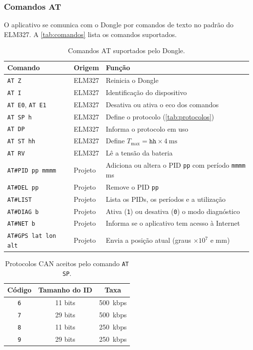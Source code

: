 \documentclass[12pt]{article}
\begin{document}
\subsubsection{Comandos AT}
 
O aplicativo se comunica com o Dongle por comandos de texto no padrão do ELM327. A \autoref{tab:comandos} lista os comandos suportados.
 
\begin{table}[htbp]
  \centering
  \caption{Comandos AT suportados pelo Dongle.}
  \label{tab:comandos}
  \begin{tabular}{lll}
    \toprule
    Comando & Origem & Função \\
    \midrule
    \texttt{AT Z}        & ELM327  & Reinicia o Dongle \\
    \texttt{AT I}        & ELM327  & Identificação do dispositivo \\
    \texttt{AT E0}, \texttt{AT E1} & ELM327 & Desativa ou ativa o eco dos comandos \\
    \texttt{AT SP h}     & ELM327  & Define o protocolo (\autoref{tab:protocolos}) \\
    \texttt{AT DP}       & ELM327  & Informa o protocolo em uso \\
    \texttt{AT ST hh}    & ELM327  & Define $T_{\max} = \mathtt{hh} \times \SI{4}{\milli\second}$ \\
    \texttt{AT RV}       & ELM327  & Lê a tensão da bateria \\
    \midrule
    \texttt{AT\#PID pp mmmm} & Projeto & Adiciona ou altera o PID \texttt{pp} com período \texttt{mmmm} ms \\
    \texttt{AT\#DEL pp}  & Projeto & Remove o PID \texttt{pp} \\
    \texttt{AT\#LIST}    & Projeto & Lista os PIDs, os períodos e a utilização \\
    \texttt{AT\#DIAG b}  & Projeto & Ativa (\texttt{1}) ou desativa (\texttt{0}) o modo diagnóstico \\
    \texttt{AT\#NET b}   & Projeto & Informa se o aplicativo tem acesso à Internet \\
    \texttt{AT\#GPS lat lon alt} & Projeto & Envia a posição atual (graus $\times 10^7$ e mm) \\
    \bottomrule
  \end{tabular}
\end{table}
 
\begin{table}[htbp]
  \centering
  \caption{Protocolos CAN aceitos pelo comando \texttt{AT SP}.}
  \label{tab:protocolos}
  \begin{tabular}{ccc}
    \toprule
    Código & Tamanho do ID & Taxa \\
    \midrule
    \texttt{6} & 11 bits & \SI{500}{kbps} \\
    \texttt{7} & 29 bits & \SI{500}{kbps} \\
    \texttt{8} & 11 bits & \SI{250}{kbps} \\
    \texttt{9} & 29 bits & \SI{250}{kbps} \\
    \bottomrule
  \end{tabular}
\end{table}
 
\end{document}
